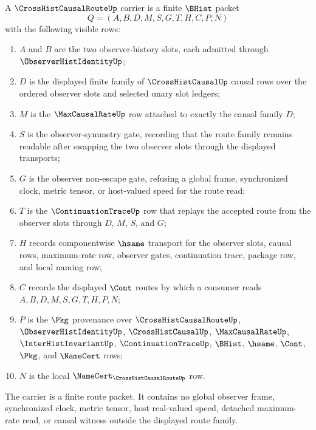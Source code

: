 \begin{definition}
\label{def:cross-hist-causal-route-carrier}
A $\CrossHistCausalRouteUp$ carrier is a finite $\BHist$ packet
$$
Q=(A,B,D,M,S,G,T,H,C,P,N)
$$
with the following visible rows:
\begin{enumerate}
\item $A$ and $B$ are the two observer-history slots, each admitted through $\ObserverHistIdentityUp$;
\item $D$ is the displayed finite family of $\CrossHistCausalUp$ causal rows over the ordered observer slots and selected unary slot ledgers;
\item $M$ is the $\MaxCausalRateUp$ row attached to exactly the causal family $D$;
\item $S$ is the observer-symmetry gate, recording that the route family remains readable after swapping the two observer slots through the displayed transports;
\item $G$ is the observer non-escape gate, refusing a global frame, synchronized clock, metric tensor, or host-valued speed for the route read;
\item $T$ is the $\ContinuationTraceUp$ row that replays the accepted route from the observer slots through $D$, $M$, $S$, and $G$;
\item $H$ records componentwise $\hsame$ transport for the observer slots, causal rows, maximum-rate row, observer gates, continuation trace, package row, and local naming row;
\item $C$ records the displayed $\Cont$ routes by which a consumer reads $A,B,D,M,S,G,T,H,P,N$;
\item $P$ is the $\Pkg$ provenance over $\CrossHistCausalRouteUp$, $\ObserverHistIdentityUp$, $\CrossHistCausalUp$, $\MaxCausalRateUp$, $\InterHistInvariantUp$, $\ContinuationTraceUp$, $\BHist$, $\hsame$, $\Cont$, $\Pkg$, and $\NameCert$ rows;
\item $N$ is the local $\NameCert_{\CrossHistCausalRouteUp}$ row.
\end{enumerate}
The carrier is a finite route packet. It contains no global observer frame, synchronized clock, metric tensor, host real-valued speed, detached maximum-rate read, or causal witness outside the displayed route family.
\end{definition}

